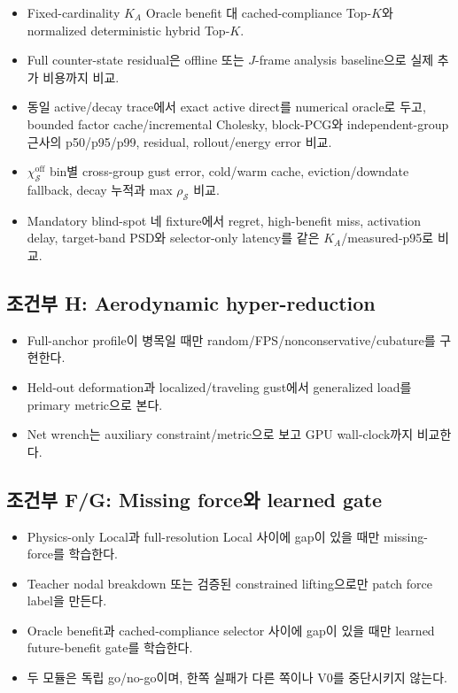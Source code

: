 \documentclass[11pt,a4paper]{article}
\begin{document}
\begin{itemize}[leftmargin=1.5em]
  \item Fixed-cardinality \(K_A\) Oracle benefit 대 cached-compliance Top-\(K\)와
  normalized deterministic hybrid Top-\(K\).
  \item Full counter-state residual은 offline 또는 \(J\)-frame analysis baseline으로 실제 추가 비용까지 비교.
  \item 동일 active/decay trace에서 exact active direct를 numerical oracle로 두고,
  bounded factor cache/incremental Cholesky, block-PCG와 independent-group 근사의
  p50/p95/p99, residual, rollout/energy error 비교.
  \item \(\chi_{\mathcal S}^{\mathrm{off}}\) bin별 cross-group gust error,
  cold/warm cache, eviction/downdate fallback, decay 누적과 max \(\rho_{\mathcal S}\) 비교.
  \item Mandatory blind-spot 네 fixture에서 regret, high-benefit miss, activation delay,
  target-band PSD와 selector-only latency를 같은 \(K_A\)/measured-p95로 비교.
\end{itemize}

\subsection{조건부 H: Aerodynamic hyper-reduction}

\begin{itemize}[leftmargin=1.5em]
  \item Full-anchor profile이 병목일 때만 random/FPS/nonconservative/cubature를 구현한다.
  \item Held-out deformation과 localized/traveling gust에서 generalized load를 primary metric으로 본다.
  \item Net wrench는 auxiliary constraint/metric으로 보고 GPU wall-clock까지 비교한다.
\end{itemize}

\subsection{조건부 F/G: Missing force와 learned gate}

\begin{itemize}[leftmargin=1.5em]
  \item Physics-only Local과 full-resolution Local 사이에 gap이 있을 때만 missing-force를 학습한다.
  \item Teacher nodal breakdown 또는 검증된 constrained lifting으로만 patch force label을 만든다.
  \item Oracle benefit과 cached-compliance selector 사이에 gap이 있을 때만 learned future-benefit gate를 학습한다.
  \item 두 모듈은 독립 go/no-go이며, 한쪽 실패가 다른 쪽이나 V0를 중단시키지 않는다.
\end{itemize}
\end{document}
